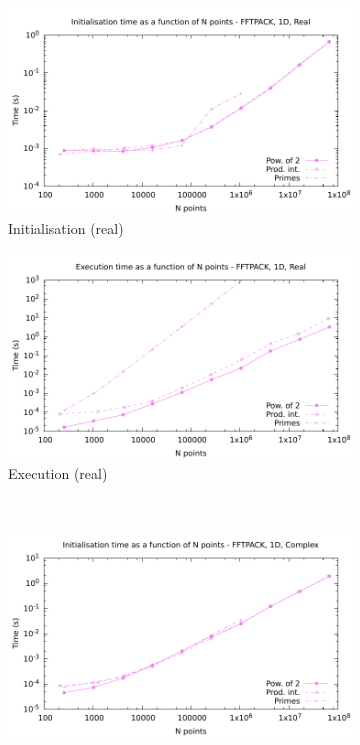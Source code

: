\documentclass[12pt, a4paper]{article} \setlength{\textheight}{24cm}
\begin{document}
\begin{figure}[H]
  \captionsetup{width=0.8\linewidth}
  \centering
  \begin{subfigure}{.5\textwidth}
    \centering
    \includegraphics[width=.9\linewidth]{graphs/1d-fftpack-init-r.pdf}
    \caption{Initialisation (real)}
    \label{1DFFTPACKRI}
  \end{subfigure}%
  \begin{subfigure}{.5\textwidth}
    \centering
    \includegraphics[width=.9\linewidth]{graphs/1d-fftpack-exec-r.pdf}
    \caption{Execution (real)}
    \label{1DFFTPACKR}
  \end{subfigure}\\
  \begin{subfigure}{.5\textwidth}
    \centering
    \includegraphics[width=.9\linewidth]{graphs/1d-fftpack-init-c.pdf}

\end{subfigure}
\end{figure}
\end{document}

